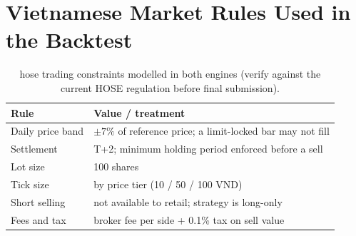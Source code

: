\chapter{Vietnamese Market Rules Used in the Backtest}
\label{app:vn-rules}

\begin{table}[H]
  \centering
  \caption[\acrshort{hose} trading constraints modelled in both engines]{\acrshort{hose}
    trading constraints modelled in both engines (verify against the current HOSE regulation
    before final submission).}
  \label{tab:vn-rules}
  \begin{tabularx}{\linewidth}{lX}
    \toprule
    Rule & Value / treatment \\
    \midrule
    Daily price band  & $\pm 7\%$ of reference price; a limit-locked bar may not fill \\
    Settlement        & T+2; minimum holding period enforced before a sell \\
    Lot size          & 100 shares \\
    Tick size         & by price tier (10 / 50 / 100 VND) \\
    Short selling     & not available to retail; strategy is long-only \\
    Fees and tax      & broker fee per side + 0.1\% tax on sell value \\
    \bottomrule
  \end{tabularx}
\end{table}
